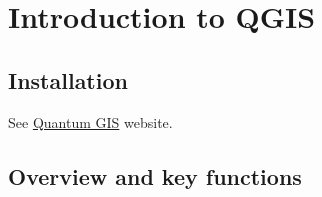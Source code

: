 \chapter{Introduction to \textsf{QGIS}}\label{app_IntroQGIS}

\section{Installation}
See \href{http://www.qgis.org/}{Quantum GIS} website.

\section{Overview and key functions}
